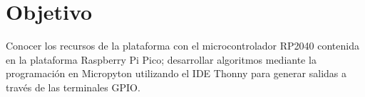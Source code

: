 
\section{Objetivo}
Conocer los recursos de la plataforma con el microcontrolador RP2040 contenida en la plataforma Raspberry Pi Pico; desarrollar algoritmos mediante la programación en Micropyton utilizando el IDE Thonny para generar salidas a través de las terminales GPIO.